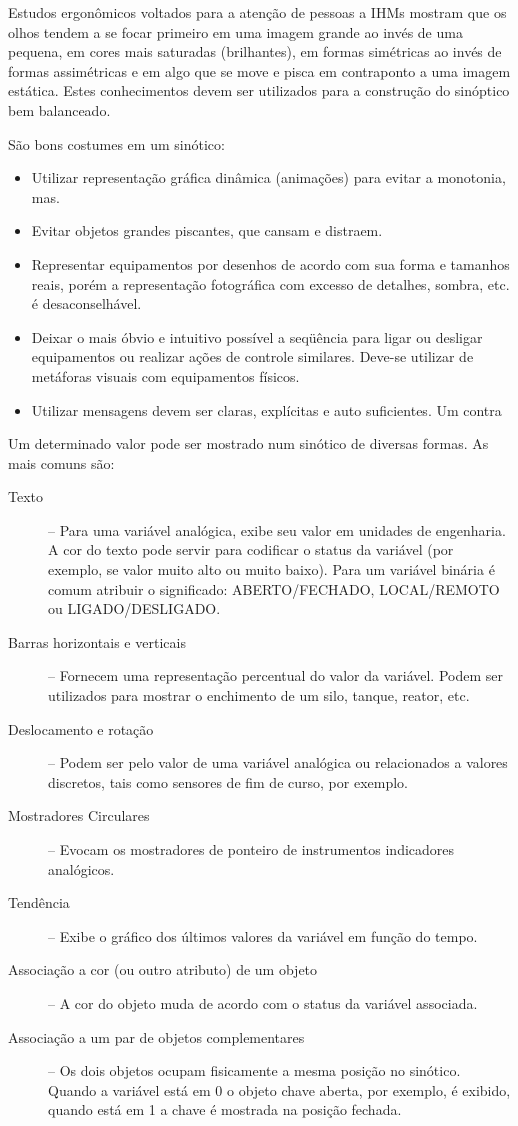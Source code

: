 Estudos ergonômicos voltados para a atenção de pessoas a IHMs mostram que os olhos tendem a se focar primeiro em uma imagem grande ao invés de uma pequena, em cores mais saturadas (brilhantes), em formas simétricas ao invés de formas assimétricas e em algo que se move e pisca em contraponto a uma imagem estática. Estes conhecimentos devem ser utilizados para a construção do sinóptico bem balanceado.


São bons costumes em um sinótico:
\begin{itemize}
	\item Utilizar representação gráfica dinâmica (animações) para evitar a monotonia, mas.
	\item Evitar objetos grandes piscantes, que cansam e distraem.
	\item Representar equipamentos por desenhos de acordo com sua forma e
	tamanhos reais, porém a representação fotográfica com excesso de
	detalhes, sombra, etc. é desaconselhável.
	\item Deixar o mais óbvio e intuitivo possível a seqüência para ligar ou desligar equipamentos ou realizar ações
	de controle similares. Deve-se utilizar de metáforas visuais com equipamentos físicos.
	\item Utilizar mensagens devem ser claras, explícitas e auto suficientes. Um contra

\end{itemize}

Um determinado valor pode ser mostrado num sinótico de diversas formas. As mais comuns são:
\begin{description}
	\item[Texto] -- Para uma variável analógica, exibe seu valor em unidades de engenharia. A cor do texto pode servir
	para codificar o status da variável (por exemplo, se valor muito alto ou muito baixo). Para um variável binária é comum atribuir o significado: ABERTO/FECHADO, LOCAL/REMOTO ou
	LIGADO/DESLIGADO.
	\item[Barras horizontais e verticais] -- Fornecem uma representação percentual do valor da variável. Podem ser utilizados para mostrar o enchimento de um silo, tanque, reator, etc.
	\item[Deslocamento e rotação] --  Podem ser pelo valor de uma variável analógica ou relacionados a valores discretos, tais como sensores de fim de curso, por exemplo.
	\item[Mostradores Circulares] -- Evocam os mostradores de ponteiro de instrumentos indicadores analógicos.
	\item[Tendência] -- Exibe o gráfico dos últimos valores da variável em função do tempo.
	\item[Associação a cor (ou outro atributo) de um objeto] -- A cor do objeto muda de acordo com o status da variável associada.
	\item[Associação a um par de objetos complementares] -- Os dois objetos ocupam fisicamente a mesma posição no sinótico. Quando
	a variável está em 0 o objeto chave aberta, por exemplo, é exibido, quando está em 1 a chave é mostrada na posição fechada.
\end{description}

